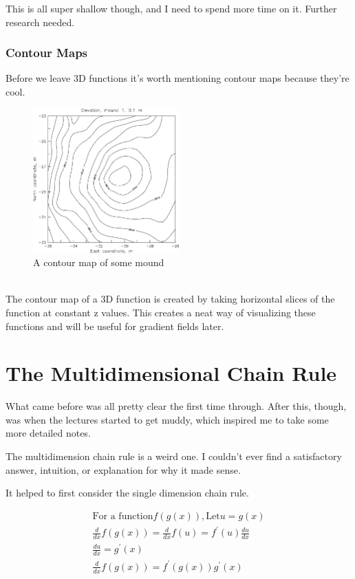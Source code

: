 \documentclass[12pt, letterpaper]{article}
\begin{document}
This is all super shallow though, and I need to spend more time on it. Further research needed.
\subsubsection{Contour Maps}
\label{sssec:Contour Maps}
Before we leave 3D functions it's worth mentioning contour maps because they're cool.\\
\begin{figure}[h]
    \centering 
    \includegraphics[width=0.5\textwidth]{contourmap}
    \caption{A contour map of some mound}
\end{figure}\\
The contour map of a 3D function is created by taking horizontal slices of the function at constant z values. This creates a neat way of visualizing these functions and will be useful for gradient fields later.

\newpage

\section{The Multidimensional Chain Rule}
What came before was all pretty clear the first time through. After this, though, was when the lectures started to get muddy, which inspired me to take some more detailed notes.

The multidimension chain rule is a weird one. I couldn't ever find a satisfactory answer, intuition, or explanation for why it made sense.

It helped to first consider the single dimension chain rule.

\begin{gather*}
    \text{For a function} f(g(x)), \text{Let} u = g(x) \\
    \frac{d}{dx} f(g(x)) = \frac{d}{dx} f(u) = f^\prime (u)\frac{du}{dx}\\
    \frac{du}{dx} = g^\prime (x)\\
    \frac{d}{dx} f(g(x)) = f^\prime (g(x)) g^\prime (x)
\end{gather*}
\end{document}
